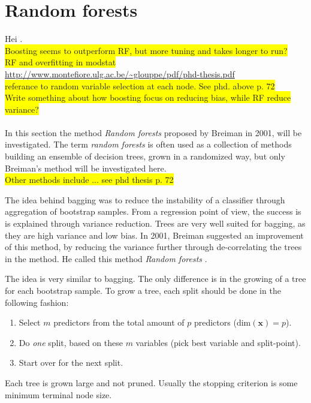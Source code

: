 \section{Random forests}
\label{sec:Random forests}
Hei \cite{randomforests}.
\\ \colorbox{yellow}{Boosting seems to outperform RF, but more tuning and takes longer to run?} \\
\colorbox{yellow}{RF and overfitting in modstat}\\
\url{http://www.montefiore.ulg.ac.be/~glouppe/pdf/phd-thesis.pdf} \\
\colorbox{yellow}{referance to random variable selection at each node. See phd. above p. 72} \\
\colorbox{yellow}{Write something about how boosting focus on reducing bias, while RF reduce variance?} \\
\\
In this section the method \textit{Random forests} proposed by Breiman \cite{randomforests} in 2001, will be investigated. The term \textit{random forests} is often used as a collection of methods building an ensemble of decision trees, grown in a randomized way, but only Breiman's method will be investigated here. 
\\\colorbox{yellow}{Other methods include ... see phd thesis p. 72}

The idea behind bagging was to reduce the instability of a classifier through aggregation of bootstrap samples. From a regression point of view, the success is is explained through variance reduction. Trees are very well suited for bagging, as they are  high variance and low bias. In 2001, Breiman suggested an improvement of this method, by reducing the variance further through de-correlating the trees in the method. He called this method \textit{Random forests} \cite{randomforests}.

The idea is very similar to bagging. The only difference is in the growing of a tree for each bootstrap sample. To grow a tree, each split should be done in the following fashion:
\begin{enumerate}
  \item Select $m$ predictors from the total amount of $p$ predictors ($\mathrm{dim}(\mathbf{x}) = p$).
  \item Do \textit{one} split, based on these $m$ variables (pick best variable and split-point). 
  \item Start over for the next split.
\end{enumerate}
Each tree is grown large and not pruned. Usually the stopping criterion is some minimum terminal node size.

